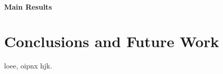\documentclass[a4paper]{article}
\begin{document}
 \paragraph{Main Results}




\section{Conclusions and Future Work}

loee, oipnx hjk.

\appendix












\end{document}
